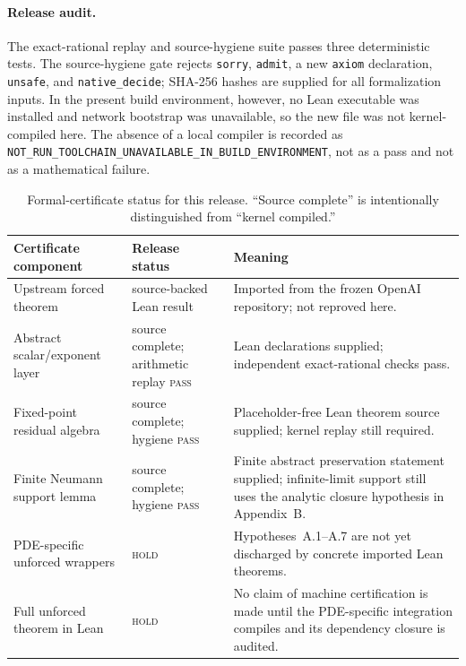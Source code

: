 \documentclass[11pt]{article}
\numberwithin{equation}{section}
\newcommand{\statuspass}{\textsc{pass}}
\newcommand{\statushold}{\textsc{hold}}
\begin{document}
\paragraph{Release audit.}
The exact-rational replay and source-hygiene suite passes three deterministic tests.  The source-hygiene gate rejects \texttt{sorry}, \texttt{admit}, a new \texttt{axiom} declaration, \texttt{unsafe}, and \texttt{native\_decide}; SHA-256 hashes are supplied for all formalization inputs.  In the present build environment, however, no Lean executable was installed and network bootstrap was unavailable, so the new file was not kernel-compiled here.  The absence of a local compiler is recorded as \texttt{NOT\_RUN\_TOOLCHAIN\_UNAVAILABLE\_IN\_BUILD\_ENVIRONMENT}, not as a pass and not as a mathematical failure.

\begin{table}[h]
\centering
\small
\begin{tabularx}{\textwidth}{@{}p{}p{}X@{}}
\toprule
Certificate component & Release status & Meaning \\
\midrule
Upstream forced theorem & source-backed Lean result & Imported from the frozen OpenAI repository; not reproved here. \\
Abstract scalar/exponent layer & source complete; arithmetic replay \statuspass & Lean declarations supplied; independent exact-rational checks pass. \\
Fixed-point residual algebra & source complete; hygiene \statuspass & Placeholder-free Lean theorem source supplied; kernel replay still required. \\
Finite Neumann support lemma & source complete; hygiene \statuspass & Finite abstract preservation statement supplied; infinite-limit support still uses the analytic closure hypothesis in Appendix~B. \\
PDE-specific unforced wrappers & \statushold & Hypotheses~A.1--A.7 are not yet discharged by concrete imported Lean theorems. \\
Full unforced theorem in Lean & \statushold & No claim of machine certification is made until the PDE-specific integration compiles and its dependency closure is audited. \\
\bottomrule
\end{tabularx}
\caption{Formal-certificate status for this release.  ``Source complete'' is intentionally distinguished from ``kernel compiled.''}
\label{tab:leanstatus}
\end{table}
\end{document}
